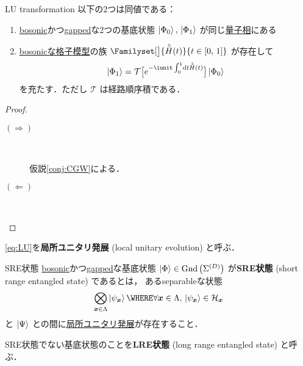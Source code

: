 \documentclass[TQFT_main]{subfiles}
\begin{document}
\begin{myprop}[label=prop:LU]{LU transformation}
    以下の2つは同値である：
    \begin{enumerate}
        \item \hyperref[def:bosonic-lattice-model]{bosonic}かつ\hyperref[def:gapped]{gapped}な2つの基底状態 $\ket{\Phi_0},\, \ket{\Phi_1}$ が同じ\hyperref[def:quantum-phase]{量子相}にある
        \item \hyperref[def:bosonic-lattice-model]{bosonicな格子模型}の族 $\Familyset[\big]{\hat{\tilde{H}}(t)}{t \in [0,\, 1]}$ が存在して
        \begin{align}
            \label{eq:LU}
            \ket{\Phi_1} = \mathcal{T} \bigl[ e^{-\iunit \int_0^1 \dd{t} \hat{\tilde{H}}(t)} \bigr] \ket{\Phi_0}
        \end{align}
        を充たす．ただし $\mathcal{T}$ は経路順序積である．
    \end{enumerate}
\end{myprop}

\begin{proof}
    \begin{description}
        \item[$\bm{(\Longrightarrow)}$]　
        
        仮説\ref{conj:CGW}による．

        \item[$\bm{(\Longleftarrow)}$]　
        

    \end{description}
    
\end{proof}

\eqref{eq:LU}を\textbf{局所ユニタリ発展} (local unitary evolution) と呼ぶ．

\begin{mydef}[label=def:SRE]{SRE状態}
    \hyperref[def:bosonic-lattice-model]{bosonic}かつ\hyperref[def:gapped]{gapped}な基底状態 $\ket{\Phi} \in \mathrm{Gnd}\left(\Sigma^{(D)}\right)$ が\textbf{SRE状態} (short range entangled state) であるとは，
    あるseparableな状態
    \begin{align}
        \bigotimes_{\bm{x} \in \Lambda} \ket{\psi_{\bm{x}}} \WHERE \forall \bm{x} \in \Lambda,\, \ket{\psi_{\bm{x}}} \in \mathcal{H}_{\bm{x}}
    \end{align}
    と $\ket{\Psi}$ との間に\hyperref[prop:LU]{局所ユニタリ発展}が存在すること．
    
    \tcblower

    SRE状態でない基底状態のことを\textbf{LRE状態} (long range entangled state) と呼ぶ．
\end{mydef}
\end{document}
